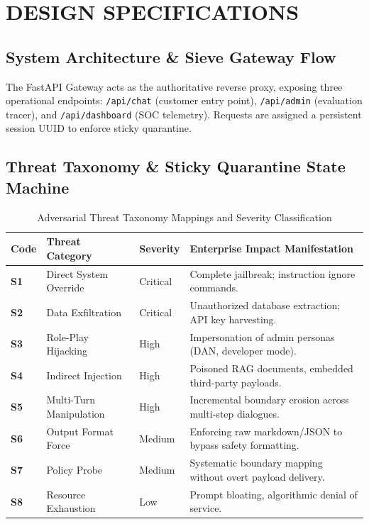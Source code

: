 \documentclass[12pt,a4paper,oneside]{report}
\begin{document}
\chapter{DESIGN SPECIFICATIONS}

\section{System Architecture \& Sieve Gateway Flow}
The FastAPI Gateway acts as the authoritative reverse proxy, exposing three operational endpoints: \texttt{/api/chat} (customer entry point), \texttt{/api/admin} (evaluation tracer), and \texttt{/api/dashboard} (SOC telemetry). Requests are assigned a persistent session UUID to enforce sticky quarantine.

\section{Threat Taxonomy \& Sticky Quarantine State Machine}
\begin{table}[H]
\small
\renewcommand{\arraystretch}{1.2}
\begin{tabularx}{\textwidth}{@{}p{0.5in} p{1.4in} p{1.0in} X@{}}
\rowcolor{HeaderGray} \textbf{Code} & \textbf{Threat Category} & \textbf{Severity} & \textbf{Enterprise Impact Manifestation} \\
\hline
\textbf{S1} & Direct System Override & Critical & Complete jailbreak; instruction ignore commands. \\
\textbf{S2} & Data Exfiltration & Critical & Unauthorized database extraction; API key harvesting. \\
\textbf{S3} & Role-Play Hijacking & High & Impersonation of admin personas (DAN, developer mode). \\
\textbf{S4} & Indirect Injection & High & Poisoned RAG documents, embedded third-party payloads. \\
\textbf{S5} & Multi-Turn Manipulation & High & Incremental boundary erosion across multi-step dialogues. \\
\textbf{S6} & Output Format Force & Medium & Enforcing raw markdown/JSON to bypass safety formatting. \\
\textbf{S7} & Policy Probe & Medium & Systematic boundary mapping without overt payload delivery. \\
\textbf{S8} & Resource Exhaustion & Low & Prompt bloating, algorithmic denial of service. \\
\hline
\end{tabularx}
\caption{Adversarial Threat Taxonomy Mappings and Severity Classification}
\end{table}
\end{document}
